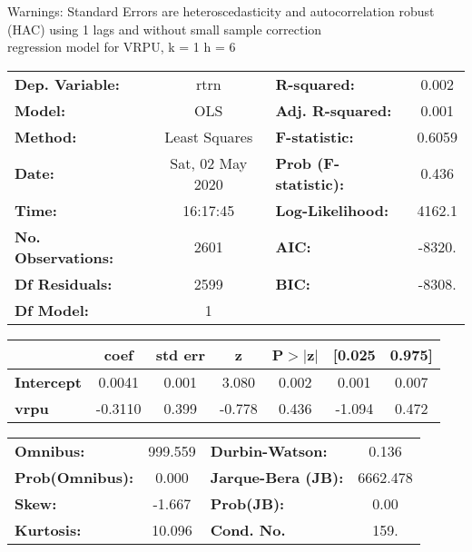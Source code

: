 Warnings: \newline
 [1] Standard Errors are heteroscedasticity and autocorrelation robust (HAC) using 1 lags and without small sample correction\\ 

regression model for VRPU, k = 1 h = 6\begin{center}
\begin{tabular}{lclc}
\toprule
\textbf{Dep. Variable:}    &       rtrn       & \textbf{  R-squared:         } &     0.002   \\
\textbf{Model:}            &       OLS        & \textbf{  Adj. R-squared:    } &     0.001   \\
\textbf{Method:}           &  Least Squares   & \textbf{  F-statistic:       } &    0.6059   \\
\textbf{Date:}             & Sat, 02 May 2020 & \textbf{  Prob (F-statistic):} &    0.436    \\
\textbf{Time:}             &     16:17:45     & \textbf{  Log-Likelihood:    } &    4162.1   \\
\textbf{No. Observations:} &        2601      & \textbf{  AIC:               } &    -8320.   \\
\textbf{Df Residuals:}     &        2599      & \textbf{  BIC:               } &    -8308.   \\
\textbf{Df Model:}         &           1      & \textbf{                     } &             \\
\bottomrule
\end{tabular}
\begin{tabular}{lcccccc}
                   & \textbf{coef} & \textbf{std err} & \textbf{z} & \textbf{P$> |$z$|$} & \textbf{[0.025} & \textbf{0.975]}  \\
\midrule
\textbf{Intercept} &       0.0041  &        0.001     &     3.080  &         0.002        &        0.001    &        0.007     \\
\textbf{vrpu}      &      -0.3110  &        0.399     &    -0.778  &         0.436        &       -1.094    &        0.472     \\
\bottomrule
\end{tabular}
\begin{tabular}{lclc}
\textbf{Omnibus:}       & 999.559 & \textbf{  Durbin-Watson:     } &    0.136  \\
\textbf{Prob(Omnibus):} &   0.000 & \textbf{  Jarque-Bera (JB):  } & 6662.478  \\
\textbf{Skew:}          &  -1.667 & \textbf{  Prob(JB):          } &     0.00  \\
\textbf{Kurtosis:}      &  10.096 & \textbf{  Cond. No.          } &     159.  \\
\bottomrule
\end{tabular}
\end{center}

